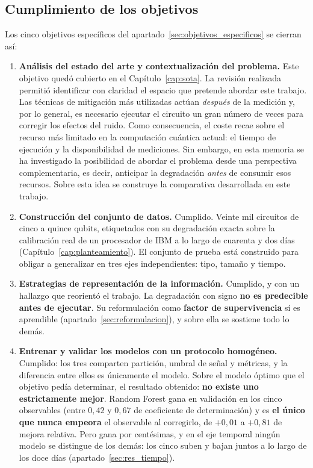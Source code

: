 \subsection*{Cumplimiento de los objetivos}

Los cinco objetivos específicos del apartado~\ref{sec:objetivos_especificos} se cierran así:

\begin{enumerate}
    \item \textbf{Análisis del estado del arte y contextualización del problema.} Este objetivo quedó cubierto en el Capítulo~\ref{cap:sota}. La revisión realizada permitió identificar con claridad el espacio que pretende abordar este trabajo. Las técnicas de mitigación más utilizadas actúan \emph{después} de la medición y, por lo general, es necesario ejecutar el circuito un gran número de veces para corregir los efectos del ruido. Como consecuencia, el coste recae sobre el recurso más limitado en la computación cuántica actual: el tiempo de ejecución y la disponibilidad de mediciones. Sin embargo, en esta memoria se ha investigado la posibilidad de abordar el problema desde una perspectiva complementaria, es decir, anticipar la degradación \emph{antes} de consumir esos recursos. Sobre esta idea se construye la comparativa desarrollada en este trabajo.

    \item \textbf{Construcción del conjunto de datos.} Cumplido. Veinte mil circuitos de cinco
          a quince qubits, etiquetados con su degradación exacta sobre la calibración real de
          un procesador de IBM a lo largo de cuarenta y dos días
          (Capítulo~\ref{cap:planteamiento}). El conjunto de prueba está construido para obligar a generalizar en tres
          ejes independientes: tipo, tamaño y tiempo.

    \item \textbf{Estrategias de representación de la información.} Cumplido, y con un hallazgo
          que reorientó el trabajo. La degradación con signo \textbf{no es predecible antes de
          ejecutar}. Su reformulación como \textbf{factor de supervivencia} sí es aprendible
          (apartado~\ref{sec:reformulacion}), y sobre ella se sostiene todo lo demás.

    \item \textbf{Entrenar y validar los modelos con un protocolo homogéneo.} Cumplido: los
          tres comparten partición, umbral de señal y métricas, y la diferencia entre ellos es
          únicamente el modelo. Sobre el modelo óptimo que el objetivo pedía determinar, el
          resultado obtenido: \textbf{no existe uno estrictamente
          mejor}. Random Forest gana en validación en los cinco observables (entre $0{,}42$ y
          $0{,}67$ de coeficiente de determinación) y es \textbf{el único que nunca empeora} el
          observable al corregirlo, de $+0{,}01$ a $+0{,}81$ de mejora relativa. Pero gana por
          centésimas, y en el eje temporal ningún modelo se distingue de los demás: los cinco
          suben y bajan juntos a lo largo de los doce días (apartado~\ref{sec:res_tiempo}).


\end{enumerate}
